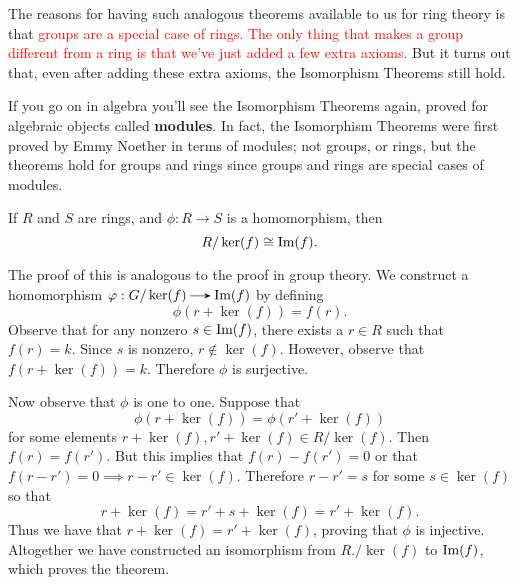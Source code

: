     The reasons for having such analogous theorems available to us
    for ring theory is that \textcolor{Red}{groups are a
    special case of rings. The only thing that makes a group
    different from a ring
    is that we've just added a few extra axioms.} But it turns out
    that, even after adding these extra axioms, the Isomorphism
    Theorems still hold. 

    If you go on in algebra you'll see the Isomorphism Theorems
    again, proved for algebraic objects called \textbf{modules}. In
    fact, the Isomorphism Theorems were first proved by Emmy
    Noether in terms of modules; not groups, or rings, but the
    theorems hold for groups and rings since
    groups and rings are special cases of modules.

    \begin{thm}If $R$ and $S$ are rings, and $\phi: R \to S$ is a
        homomorphism, then 
        \[
            R/\ker(f) \cong \mbox{Im}(f).
        \]
    \end{thm}

    \begin{prf}
        The proof of this is analogous to the proof in group
        theory. We construct a homomorphism $\phi:G/\ker(f) \to
        \im(f)$ by defining 
        \[
            \phi(r + \ker(f)) = f(r).
        \]
        Observe that for any nonzero $s \in \mbox{Im}(f)$, there exists
        a $r \in R$ such that $f(r) = k$. Since $s$ is nonzero, $r
        \not\in \ker(f)$. However, observe that $f(r + \ker(f))
        = k$. Therefore $\phi$ is surjective. 

        Now observe that $\phi$ is one to one. Suppose that 
        \[ 
            \phi(r + \ker(f)) = \phi(r' + \ker(f))
        \] 
        for some elements $r + \ker(f), r' + \ker(f) \in
        R/\ker(f)$. Then $f(r) = f(r')$. But this implies that 
        $f(r) - f(r') = 0$ or that $f(r - r')
        = 0 \implies r-r' \in \ker(f)$. Therefore $r - r' = s$ for
        some $s \in \ker(f)$ so that 
        \[
            r + \ker(f) = r' + s + \ker(f) = r' + \ker(f).
        \]
        Thus we have that $r + \ker(f) = r' + \ker(f)$, proving
        that $\phi$ is injective. Altogether we have constructed
        an isomorphism from $R./\ker(f)$ to $\mbox{Im}(f)$, which proves
        the theorem.
    \end{prf}

